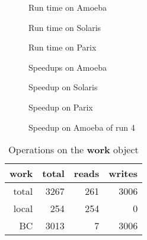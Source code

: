 \documentclass[a4paper,11pt]{article}
\begin{document}
\begin{figure}[p]
\begin{center}
\caption{Run time on Amoeba}
\label{fig:zoo-times}
\end{center}
\end{figure}

\begin{figure}[p]
\begin{center}
\caption{Run time on Solaris}
\label{fig:sol-times}
\end{center}
\end{figure}

\begin{figure}[p]
\begin{center}
\caption{Run time on Parix}
\label{fig:ppc-times}
\end{center}
\end{figure}

\begin{figure}[p]
\begin{center}
\caption{Speedups on Amoeba}
\label{fig:zoo-speedup}
\end{center}
\end{figure}

\begin{figure}[p]
\begin{center}
\caption{Speedup on Solaris}
\label{fig:sol-speedup}
\end{center}
\end{figure}

\begin{figure}[p]
\begin{center}
\caption{Speedup on Parix}
\label{fig:ppc-speedup}
\end{center}
\end{figure}

\begin{figure}[p]
\begin{center}
\caption{Speedup on Amoeba of run 4}
\label{fig:zoo-72speedup}
\end{center}
\end{figure}

\begin{table}[H]
\begin{center}
\begin{tabular}{|r|r|r|r|}
\hline
{\bf work}  & total & reads & writes \\
\hline
total & 3267 & 261 & 3006 \\
local &  254 & 254 &    0 \\
BC    & 3013 &   7 & 3006 \\
\hline
\end{tabular}
\end{center}
\caption{Operations on the {\bf work} object}
\label{table:work}
\end{table}
\end{document}
